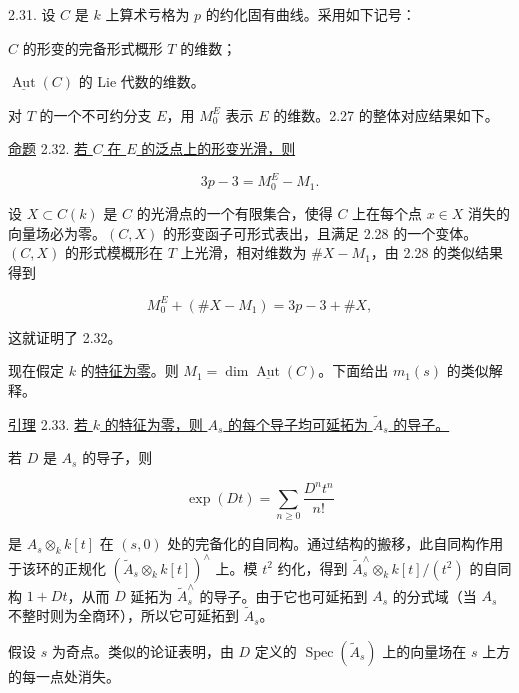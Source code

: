
2.31. 设 $C$ 是 $k$ 上算术亏格为 $p$ 的约化固有曲线。采用如下记号：

\begin{description}[leftmargin=2.7cm,style=nextline]
\item[$M_0$] $C$ 的形变的完备形式概形 $T$ 的维数；
\item[$M_1$] $\underline{\operatorname{Aut}}(C)$ 的 Lie 代数的维数。
\end{description}

对 $T$ 的一个不可约分支 $E$，用 $M_0^E$ 表示 $E$ 的维数。2.27 的整体对应结果如下。

\underline{命题} 2.32. \underline{若 $C$ 在 $E$ 的泛点上的形变光滑，则}

\begin{equation*}
3p-3=M_0^E-M_1.
\end{equation*}

设 $X\subset C(k)$ 是 $C$ 的光滑点的一个有限集合，使得 $C$ 上在每个点 $x\in X$ 消失的向量场必为零。$(C,X)$ 的形变函子可形式表出，且满足 2.28 的一个变体。$(C,X)$ 的形式模概形在 $T$ 上光滑，相对维数为 $\#X-M_1$，由 2.28 的类似结果得到

\begin{equation*}
M_0^E+(\#X-M_1)=3p-3+\#X,
\end{equation*}

这就证明了 2.32。

现在假定 $k$ 的\underline{特征为零}。则 $M_1=\dim\underline{\operatorname{Aut}}(C)$。下面给出 $m_1(s)$ 的类似解释。


\underline{引理} 2.33. \underline{若 $k$ 的特征为零，则 $A_s$ 的每个导子均可延拓为 $\widetilde A_s$ 的导子。}

若 $D$ 是 $A_s$ 的导子，则

\begin{equation*}
\exp(Dt)=\sum_{n\geq0}\frac{D^nt^n}{n!}
\end{equation*}

是 $A_s\otimes_k k[t]$ 在 $(s,0)$ 处的完备化的自同构。通过结构的搬移，此自同构作用于该环的正规化 $(\widetilde A_s\otimes_k k[t])^{\wedge}$ 上。模 $t^2$ 约化，得到 $\widetilde A_s^{\wedge}\otimes_k k[t]/(t^2)$ 的自同构 $1+Dt$，从而 $D$ 延拓为 $\widetilde A_s^{\wedge}$ 的导子。由于它也可延拓到 $A_s$ 的分式域（当 $A_s$ 不整时则为全商环），所以它可延拓到 $\widetilde A_s$。

假设 $s$ 为奇点。类似的论证表明，由 $D$ 定义的 $\operatorname{Spec}(\widetilde A_s)$ 上的向量场在 $s$ 上方的每一点处消失。

